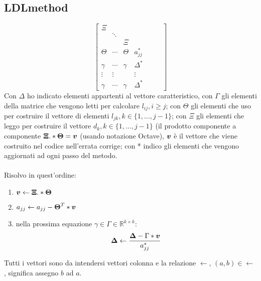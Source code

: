 \subsection{LDLmethod}
\label{subsection:LDLmethod}
\begin{oss}
\begin{displaymath}
\begin{bmatrix}
\Xi \\
 &  \ddots \\
 & &  \Xi \\
\Theta & \cdots & \Theta & a_{jj}^{*} &  &  &    
	 \\ \gamma & \cdots & \gamma & \Delta^{*}
	 \\ \vdots & \vdots &  & \vdots
	 \\ \gamma & \cdots & \gamma & \Delta^{*}
\end{bmatrix}
\end{displaymath}
Con $\Delta$ ho indicato elementi appartenti al vettore caratteristico,  con
$\Gamma$ gli elementi della matrice che vengono letti per calcolare $l_{ij}, i
\geq j$; con $\Theta$ gli elementi che uso per costruire il vettore di elementi 
$l_{jk}, k \in \{1, \ldots, j-1 \}$; con $\Xi$ gli elementi che leggo 
per costruire il vettore $d_{k}, k \in \{1, \ldots, j-1 \}$ (il prodotto
componente a componente $\boldsymbol{\Xi}.*\boldsymbol{\Theta} = \boldsymbol{v}$ (usando notazione
Octave), $\boldsymbol{v}$ \`e il vettore che viene costruito nel codice nell'errata
corrige; con * indico gli elementi che vengono aggiornati ad ogni passo del
metodo.
\\ \\
Risolvo in quest'ordine:
\begin{enumerate}
  \item $\boldsymbol{v} \leftarrow \boldsymbol{\Xi}.*\boldsymbol{\Theta}$
  \item $a_{jj} \leftarrow a_{jj} - \boldsymbol{\Theta}^{T} * \boldsymbol{v}$
  \item nella prossima equazione $\gamma \in \Gamma \in \mathbb{R}^{k \times
  k}$:
  \begin{displaymath}
	  \boldsymbol{\Delta} \leftarrow \frac{\boldsymbol{\Delta} - \Gamma *
	  \boldsymbol{v}}{a_{jj}^{*}}
  \end{displaymath}
\end{enumerate}
Tutti i vettori sono da intendersi vettori colonna e la relazione $\leftarrow$,
$(a, b) \in \leftarrow$, significa assegno $b$ ad $a$.
\end{oss}


